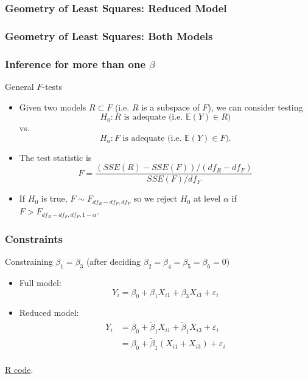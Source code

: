 \documentclass[handout]{beamer}
\begin{document}
   \begin{frame} \frametitle{Geometry of Least Squares: Reduced Model}

   \end{frame}


   \begin{frame} \frametitle{Geometry of Least Squares: Both Models}

   \end{frame}


   \begin{frame} \frametitle{Inference for more than one $\beta$}

   \begin{block}
   { General   $F$-tests}
   \begin{itemize}
   \item Given two models $R \subset F$ (i.e. $R$ is a subspace of $F$),
   we can consider testing
   $$
   H_0: \text{$R$ is adequate (i.e. $\mathbb{E}(Y) \in R$)}$$
   vs.
   $$
   H_a: \text{$F$ is adequate (i.e. $\mathbb{E}(Y) \in F$)}.$$

   \item The test statistic is
   $$
   F = \frac{(SSE(R) - SSE(F)) / (df_R - df_F)}{SSE(F)/df_F}$$

   \item If $H_0$ is true, $F \sim F_{df_R-df_F, df_F}$ so we reject
   $H_0$ at level $\alpha$ if  $F > F_{df_R-df_F, df_F, 1-\alpha}$.
   \end{itemize}
   \end{block}
   \end{frame}


   \begin{frame} \frametitle{Constraints}

   \begin{block}
   {Constraining $\beta_1=\beta_3$ (after deciding $\beta_2=\beta_4=\beta_5=\beta_6=0$)}
   \begin{itemize}
   \item Full model:
   $$
   Y_i = \beta_0 + \beta_1 X_{i1}  + \beta_3 X_{i3} + \varepsilon_i
   $$

   \item Reduced model:
   $$
   \begin{aligned}
   Y_i &= \beta_0 + \tilde{\beta}_1 X_{i1}  + \tilde{\beta}_1 X_{i3} + \varepsilon_i \\
   &= \beta_0 + \tilde{\beta}_1 (X_{i1}  + X_{i3}) + \varepsilon_i \\
   \end{aligned}
   $$
   \end{itemize}
   \href{http://stats191.stanford.edu/multiple.html}{R code}.

   \end{block}
   \end{frame}
\end{document}
